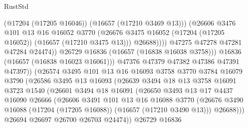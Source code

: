 \begin{lexlean}{RustStd}
\begin{coremodule}
                                  (@17204 (@17205 @16046))
                                  (@16657 (@17210 @3469 @13)))
                                (@26606
                                  @3476
                                  @101
                                  @13
                                  @16
                                  @16052
                                  @3770
                                  (@26676
                                    @3475
                                    @16052
                                    (@17204 (@17205 @16052))
                                    (@16657 (@17210 @3475 @13)))
                                  @26688))))
                          @47275
                          @47278
                          @47281
                          @47284
                          @24474))
                      @26729
                      @16836
                      (@16657 (@16838 @16038 @3758)))
                    @16836
                    (@16657 (@16838 @16023 @16061)))
                  @47376
                  @47379
                  @47382
                  @47386
                  @47391
                  @47397))
              (@26574
                @3495
                @101
                @13
                @16
                @16093
                @3758
                @3770
                @3784
                @16079
                @3790
                (@26586
                  @3495
                  @13
                  @16093
                  (@26639
                    @3494
                    @18
                    @13
                    @3758
                    @16091
                    @3723
                    @1540
                    (@26601
                      @3494
                      @18
                      @16091
                      (@26650
                        @3493
                        @13
                        @17
                        @4437
                        @16090
                        @26666
                        (@26606
                          @3491
                          @101
                          @13
                          @16
                          @16088
                          @3770
                          (@26676 @3490 @16088 (@17204 (@17205 @16088)) (@16657 (@17210 @3490 @13)))
                          @26688)))
                    @26694
                    @26697
                    @26700
                    @26703
                    @24474))
                @26729
                @16836

\end{coremodule}
\end{lexlean}
